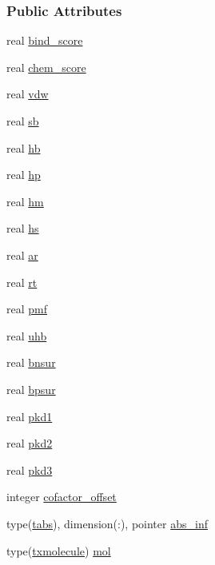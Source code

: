 \subsubsection*{Public Attributes}
\begin{DoxyCompactItemize}
\item 
real \hyperlink{structcalc__xscore_1_1txligand_a5c054024a9b2ab41fc5dcfdaf48b9703}{bind\-\_\-score}
\item 
real \hyperlink{structcalc__xscore_1_1txligand_af9f355a58e4a55f8e7077a55e3efdf46}{chem\-\_\-score}
\item 
real \hyperlink{structcalc__xscore_1_1txligand_a27c9e7ab8634605bab80c1b5b35f17f1}{vdw}
\item 
real \hyperlink{structcalc__xscore_1_1txligand_ac6b1fe564e22573b4754b8948b9a7f49}{sb}
\item 
real \hyperlink{structcalc__xscore_1_1txligand_a896362cce1998cd3d4759aea5caaa823}{hb}
\item 
real \hyperlink{structcalc__xscore_1_1txligand_a5145734904e5ff5ad2da067af42d1f01}{hp}
\item 
real \hyperlink{structcalc__xscore_1_1txligand_a48e547b481182af3cb25be9c891a2dcc}{hm}
\item 
real \hyperlink{structcalc__xscore_1_1txligand_a144f7a3b1b7fe7d0b3760b6c908191d4}{hs}
\item 
real \hyperlink{structcalc__xscore_1_1txligand_a570b41972cdcedcd2e731eaddeb130a9}{ar}
\item 
real \hyperlink{structcalc__xscore_1_1txligand_ad939b56fb08ece141fc7ffe0e06a897c}{rt}
\item 
real \hyperlink{structcalc__xscore_1_1txligand_a37cdce609338e2622092eaebe7735fff}{pmf}
\item 
real \hyperlink{structcalc__xscore_1_1txligand_a7adf24097edf9b8eaf293cead8256d6b}{uhb}
\item 
real \hyperlink{structcalc__xscore_1_1txligand_a27af1c4deba65c5b43a35949d4475bfc}{bnsur}
\item 
real \hyperlink{structcalc__xscore_1_1txligand_a57e9ab8bd9cde3276bd298ff74559404}{bpsur}
\item 
real \hyperlink{structcalc__xscore_1_1txligand_a4abba718779f82da3df9f6fd8a6ed12d}{pkd1}
\item 
real \hyperlink{structcalc__xscore_1_1txligand_a62491e1f73ab61616eecd7f87409b522}{pkd2}
\item 
real \hyperlink{structcalc__xscore_1_1txligand_a9b60deb48094f0ee65f0ff8616e2ac46}{pkd3}
\item 
integer \hyperlink{structcalc__xscore_1_1txligand_a9ca1b5c4b2c2ac0ce30518297eda7f51}{cofactor\-\_\-offset}
\item 
type(\hyperlink{structcalc__xscore_1_1tabs}{tabs}), dimension(\-:), pointer \hyperlink{structcalc__xscore_1_1txligand_a4c0a13d77613aa1393aba63e8dbceae7}{abs\-\_\-inf}
\item 
type(\hyperlink{structcalc__xscore_1_1txmolecule}{txmolecule}) \hyperlink{structcalc__xscore_1_1txligand_ac3cfc30ae032c05dcc94c1d979d2ca63}{mol}
\end{DoxyCompactItemize}


